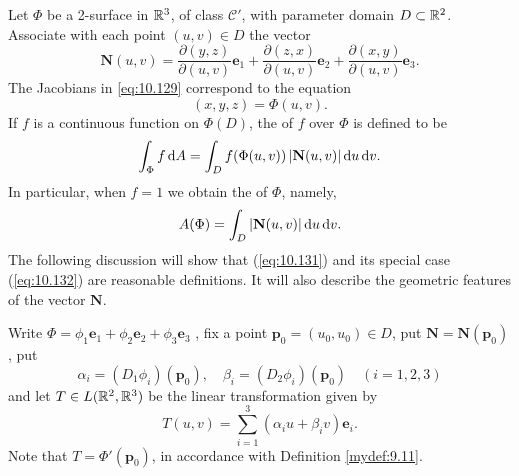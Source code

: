 \begin{mydef}
    \label{mydef:10.46}
    Let $\Phi$ be a 2-surface in ${\protect\mathbb R}^3$, of class $\mathscr{C}'$, 
    with parameter domain $D \subset {\protect\mathbb R}^2$. 
    Associate with each point $(u, v) \in D$ the vector
    \begin{equation}
        \label{eq:10.129}
        \mathbf{N}(u,v) = 
        \frac{\partial (y,z)}{\partial (u,v)} \mathbf{e}_1 + 
        \frac{\partial (z,x)}{\partial (u,v)} \mathbf{e}_2 + 
        \frac{\partial (x,y)}{\partial (u,v)} \mathbf{e}_3 .
    \end{equation}
    The Jacobians in \eqref{eq:10.129} correspond to the equation
    \begin{equation}
        \label{eq:10.130}
        (x,y,z) = \Phi(u,v).
    \end{equation}
    If $f$ is a continuous function on $\Phi(D)$, 
    the  of $f$ over $\Phi$ is defined to be
    \begin{equation}
        \label{eq:10.131}
        \int_{\Phi} f \d A = 
        \int_D f(\Phi(u,v)) \left| \mathbf{N}(u,v) \right| \d u \d v.
    \end{equation}
    In particular, when $f= 1$ we obtain the  of $\Phi$, namely,
    \begin{equation}
        \label{eq:10.132}
        A(\Phi) = \int_{D} \left| \mathbf{N}(u,v) \right| \d u \d v. 
    \end{equation}
    The following discussion will show that (\eqref{eq:10.131}) and its special case (\eqref{eq:10.132}) are reasonable definitions. 
    It will also describe the geometric features of the vector $\mathbf{N}$.

    Write $\Phi = 
    \phi_1 \mathbf{e}_1 + 
    \phi_2 \mathbf{e}_2 + 
    \phi_3 \mathbf{e}_3 $ ,
    fix a point $\mathbf{p}_0 = (u_0,u_0) \in D$, 
    put $\mathbf{N} = \mathbf{N}(\mathbf{p}_0)$, put 
    \begin{equation}
        \label{eq:10.133}
        \alpha_i = (D_1 \phi_i)(\mathbf{p}_0), \quad 
        \beta_i  = (D_2 \phi_i)(\mathbf{p}_0)  \quad 
        (i = 1,2,3)
    \end{equation}
    and let $T \in L({\protect\mathbb R}^2, {\protect\mathbb R}^3)$ be the linear transformation given by
    \begin{equation}
        \label{eq:10.134}
        T(u,v) = \sum_{i=1}^{3}\left( \alpha_i u + \beta_i v \right)\mathbf{e}_i .
    \end{equation}
    Note that $T = \Phi'(\mathbf{p}_0)$, in accordance with Definition \ref{mydef:9.11}.


\end{mydef}
